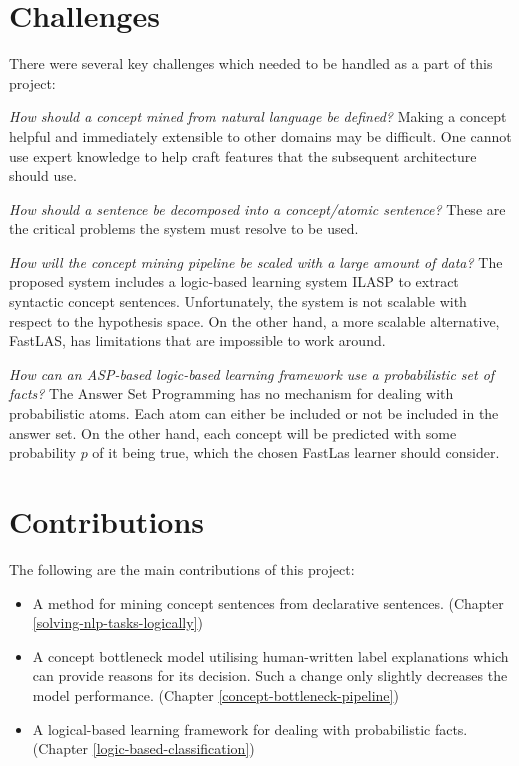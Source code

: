 \section{Challenges}

There were several key challenges which needed to be handled as a part of this project:

\emph{How should a concept mined from natural language be defined?} Making a concept helpful and immediately extensible to other domains may be difficult. One cannot use expert knowledge to help craft features that the subsequent architecture should use.
 
\emph{How should a sentence be decomposed into a concept/atomic sentence?} These are the critical problems the system must resolve to be used.

\emph{How will the concept mining pipeline be scaled with a large amount of data?} The proposed system includes a logic-based learning system ILASP \cite{RefWorks:RefID:18-law2020ilasp} to extract syntactic concept sentences. 
 Unfortunately, the system is not scalable with respect to the hypothesis space. On the other hand, a more scalable alternative, FastLAS, \cite{RefWorks:RefID:19-law2020fastlas:} has limitations that are impossible to work around.
 
\emph{How can an ASP-based logic-based learning framework use a probabilistic set of facts?} The Answer Set Programming has no mechanism for dealing with probabilistic atoms. Each atom can either be included or not be included in the answer set.
On the other hand, each concept will be predicted with some probability $p$ of it being true, which the chosen FastLas \cite{RefWorks:RefID:19-law2020fastlas:} learner should consider. 

\section{Contributions}

The following are the main contributions of this project:

\begin{itemize}
    \item A method for mining concept sentences from declarative sentences. (Chapter \ref{solving-nlp-tasks-logically})
    
    \item A concept bottleneck model utilising human-written label explanations which can provide reasons for its decision. Such a change only slightly decreases the model performance. (Chapter \ref{concept-bottleneck-pipeline})
    
    \item A logical-based learning framework for dealing with probabilistic facts. (Chapter \ref{logic-based-classification})
\end{itemize}


